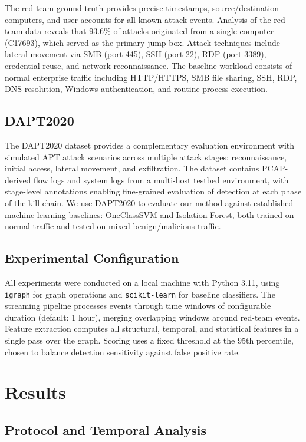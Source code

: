 \documentclass[letterpaper,twocolumn,10pt]{article}
\begin{document}
The red-team ground truth provides precise timestamps, source/destination computers, and user accounts for all known attack events. Analysis of the red-team data reveals that 93.6\% of attacks originated from a single computer (C17693), which served as the primary jump box. Attack techniques include lateral movement via SMB (port 445), SSH (port 22), RDP (port 3389), credential reuse, and network reconnaissance. The baseline workload consists of normal enterprise traffic including HTTP/HTTPS, SMB file sharing, SSH, RDP, DNS resolution, Windows authentication, and routine process execution.

\subsection{DAPT2020}

The DAPT2020 dataset provides a complementary evaluation environment with simulated APT attack scenarios across multiple attack stages: reconnaissance, initial access, lateral movement, and exfiltration. The dataset contains PCAP-derived flow logs and system logs from a multi-host testbed environment, with stage-level annotations enabling fine-grained evaluation of detection at each phase of the kill chain. We use DAPT2020 to evaluate our method against established machine learning baselines: OneClassSVM and Isolation Forest, both trained on normal traffic and tested on mixed benign/malicious traffic.

\subsection{Experimental Configuration}

All experiments were conducted on a local machine with Python 3.11, using \texttt{igraph} for graph operations and \texttt{scikit-learn} for baseline classifiers. The streaming pipeline processes events through time windows of configurable duration (default: 1 hour), merging overlapping windows around red-team events. Feature extraction computes all structural, temporal, and statistical features in a single pass over the graph. Scoring uses a fixed threshold at the 95th percentile, chosen to balance detection sensitivity against false positive rate.

\section{Results}

\subsection{Protocol and Temporal Analysis}
\end{document}
